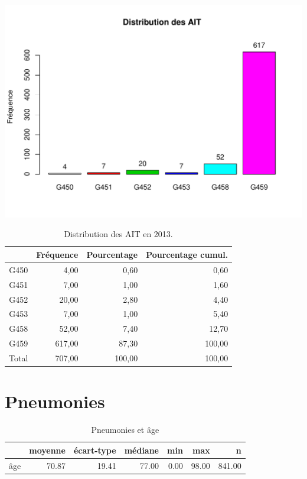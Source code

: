 \documentclass[12pt,english,french,twoside]{book}\usepackage[]{graphicx}\usepackage[]{color}
\makeatletter
\def\maxwidth{ %
  \ifdim\Gin@nat@width>\linewidth
    \linewidth
  \else
    \Gin@nat@width
  \fi
}
\makeatother
\begin{document}
\includegraphics[width=\maxwidth]{figure/ait-1} 
\begin{table}[ht]
\centering
\begin{tabular}{rrrr}
  \hline
 & Fréquence & Pourcentage & Pourcentage cumul. \\ 
  \hline
G450 & 4,00 & 0,60 & 0,60 \\ 
  G451 & 7,00 & 1,00 & 1,60 \\ 
  G452 & 20,00 & 2,80 & 4,40 \\ 
  G453 & 7,00 & 1,00 & 5,40 \\ 
  G458 & 52,00 & 7,40 & 12,70 \\ 
  G459 & 617,00 & 87,30 & 100,00 \\ 
    Total & 707,00 & 100,00 & 100,00 \\ 
   \hline
\end{tabular}
\caption[Types d'AIT]{Distribution des AIT en 2013.} 
\label{tab:ait}
\end{table}


\section{Pneumonies}

\begin{table}[ht]
\centering
\begin{tabular}{rrrrrrr}
  \hline
 & moyenne & écart-type & médiane & min & max & n \\ 
  \hline
âge & 70.87 & 19.41 & 77.00 & 0.00 & 98.00 & 841.00 \\ 
   \hline
\end{tabular}
\caption[Pneumonies et âge]{Pneumonies et âge} 
\label{tab:pneumo_age}
\end{table}
\end{document}
